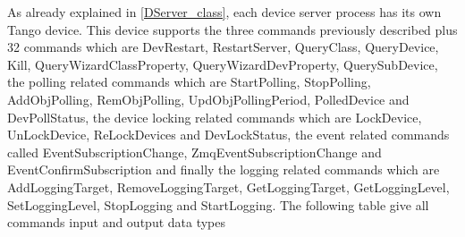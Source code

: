 As already explained in \ref{DServer_class}, each device server process
has its own Tango device. This device supports the three commands
previously described plus 32 commands which are DevRestart,
RestartServer, QueryClass,
QueryDevice, Kill, QueryWizardClassProperty,
QueryWizardDevProperty, QuerySubDevice,
the polling related commands which are StartPolling,
StopPolling, AddObjPolling,
RemObjPolling, UpdObjPollingPeriod,
PolledDevice and DevPollStatus,
the device locking related commands which are LockDevice,
UnLockDevice, ReLockDevices
and DevLockStatus, the event related commands
called EventSubscriptionChange, ZmqEventSubscriptionChange
and EventConfirmSubscription and
finally the logging related commands which are AddLoggingTarget,
RemoveLoggingTarget, GetLoggingTarget,
GetLoggingLevel, SetLoggingLevel,
StopLogging and StartLogging.
The following table give all commands input and output data types

\vspace{0.3cm}


